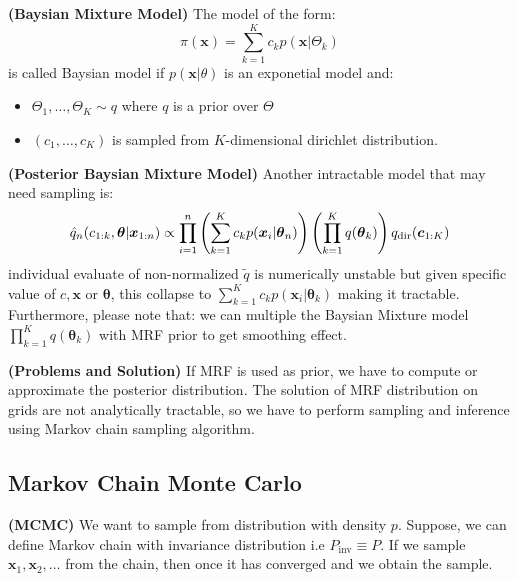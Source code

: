 \begin{definition}{\textbf{(Baysian Mixture Model)}}    
    The model of the form:
    \begin{equation*}
        \pi(\boldsymbol x) = \sum^K_{k=1} c_kp(\boldsymbol x|\Theta_k)
    \end{equation*}
    is called Baysian model if $p(\boldsymbol x | \theta)$ is an exponetial model and:
    \begin{itemize}
        \item $\Theta_1,\dots,\Theta_K\sim q$ where $q$ is a prior over $\Theta$
        \item $(c_1,\dots,c_K)$ is sampled from $K$-dimensional dirichlet distribution. 
    \end{itemize}
\end{definition}

\begin{definition}{\textbf{(Posterior Baysian Mixture Model)}}
    Another intractable model that may need sampling is:
    \begin{equation*}
        \hat{q}_n(c_{1:k}, \boldsymbol \theta | \boldsymbol x_{1:n}) \propto \prod^n_{i=1}\left( \sum^K_{k=1}c_kp(\boldsymbol x_i | \boldsymbol \theta_n) \right)\left( \prod^K_{k=1}q(\boldsymbol \theta_k) \right)q_\text{dir}(\boldsymbol c_{1:K})
    \end{equation*}
    individual evaluate of non-normalized $\tilde{q}$ is numerically unstable but given specific value of $c, \boldsymbol x$ or $\boldsymbol \theta$, this collapse to $\sum^K_{k=1}c_k p(\boldsymbol x_i | \boldsymbol \theta_k)$ making it tractable. Furthermore, please note that: we can multiple the Baysian Mixture model $\prod^K_{k=1}q(\boldsymbol \theta_k)$ with MRF prior to get smoothing effect.
\end{definition}

\begin{remark}{\textbf{(Problems and Solution)}}
    If MRF is used as prior, we have to compute or approximate the posterior distribution. The solution of MRF distribution on grids are not analytically tractable, so we have to perform sampling and inference using Markov chain sampling algorithm.
\end{remark}


\subsection{Markov Chain Monte Carlo}

\begin{definition}{\textbf{(MCMC)}}
    We want to sample from distribution with density $p$. Suppose, we can define Markov chain with invariance distribution i.e $P_\text{inv}\equiv P$. If we sample $\boldsymbol x_1,\boldsymbol x_2,\dots$ from the chain, then once it has converged and we obtain the sample. 
\end{definition}


